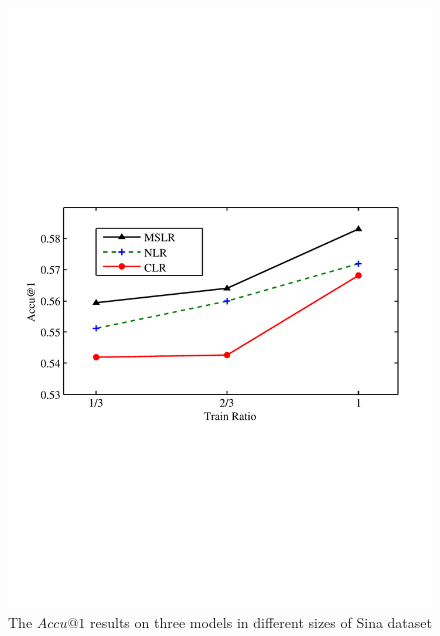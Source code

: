 \documentclass{IEEEtran}
\begin{document}
\begin{figure}[!h]
\centering
\includegraphics[width=1\linewidth,trim=0 240 0 280,clip]{Accu.pdf}
\vspace{-8pt}
\caption{The $Accu@1$ results on three models in different sizes of Sina dataset}
\label{figure:resultaccu}
\end{figure}
\end{document}
